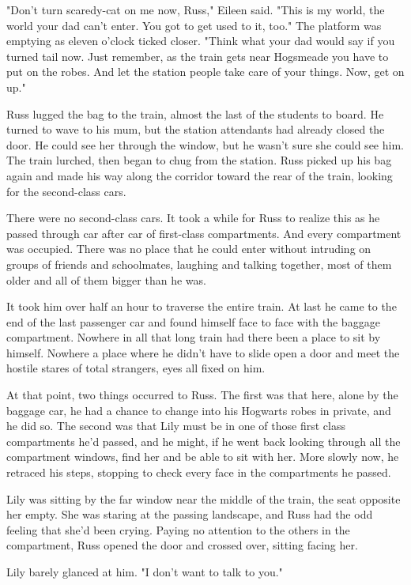 \documentclass[a4paper,11pt]{article}
\begin{document}
"Don't turn scaredy-cat on me now, Russ," Eileen said. "This is my world, the world your dad can't enter. You got to get used to it, too." The platform was emptying as eleven o'clock ticked closer. "Think what your dad would say if you turned tail now. Just remember, as the train gets near Hogsmeade you have to put on the robes. And let the station people take care of your things. Now, get on up."

Russ lugged the bag to the train, almost the last of the students to board. He turned to wave to his mum, but the station attendants had already closed the door. He could see her through the window, but he wasn't sure she could see him. The train lurched, then began to chug from the station. Russ picked up his bag again and made his way along the corridor toward the rear of the train, looking for the second-class cars.

There were no second-class cars. It took a while for Russ to realize this as he passed through car after car of first-class compartments. And every compartment was occupied. There was no place that he could enter without intruding on groups of friends and schoolmates, laughing and talking together, most of them older and all of them bigger than he was.

It took him over half an hour to traverse the entire train. At last he came to the end of the last passenger car and found himself face to face with the baggage compartment. Nowhere in all that long train had there been a place to sit by himself. Nowhere a place where he didn't have to slide open a door and meet the hostile stares of total strangers, eyes all fixed on him.

At that point, two things occurred to Russ. The first was that here, alone by the baggage car, he had a chance to change into his Hogwarts robes in private, and he did so. The second was that Lily must be in one of those first class compartments he'd passed, and he might, if he went back looking through all the compartment windows, find her and be able to sit with her. More slowly now, he retraced his steps, stopping to check every face in the compartments he passed.

Lily was sitting by the far window near the middle of the train, the seat opposite her empty. She was staring at the passing landscape, and Russ had the odd feeling that she'd been crying. Paying no attention to the others in the compartment, Russ opened the door and crossed over, sitting facing her.

Lily barely glanced at him. "I don't want to talk to you."
\end{document}
